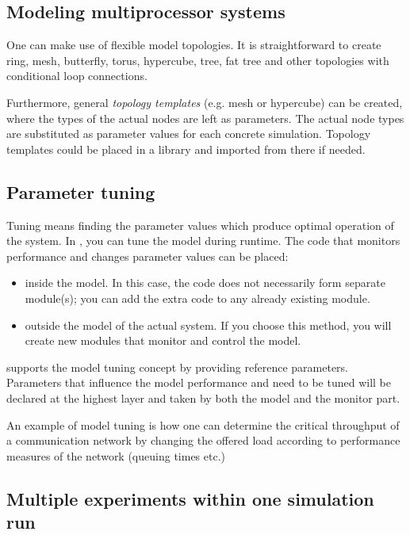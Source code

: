 \subsection{Modeling multiprocessor systems}

One can make use of flexible model topologies. It is straightforward
to create ring, mesh, butterfly, torus, hypercube, tree, fat tree and
other topologies with conditional loop
connections.


Furthermore, general \textit{topology
  templates} (e.g. mesh or hypercube) can be
created, where the types of the actual nodes are left as parameters.
The actual node types are substituted as parameter values for each
concrete simulation. Topology templates could be placed in a library
and imported from there if needed.





\subsection{Parameter tuning}

Tuning means finding the parameter values which produce optimal 
operation of the system. In {\opp}, you can tune the model during 
runtime. The code that monitors performance and changes parameter 
values can be placed:
\begin{itemize}
\item{inside the model. In this case, the code does not necessarily
    form separate module(s); you can add the extra code to any already
    existing module.}
\item{outside the model of the actual system. If you choose this
    method, you will create new modules that monitor and control the
    model.}
\end{itemize}

{\opp} supports the model tuning concept by
providing reference parameters. Parameters that influence the model
performance and need to be tuned will be declared at the highest layer
and taken by both the model and the monitor part.


An example of model tuning is how one can determine the critical 
throughput of a communication network by changing the offered 
load according to performance measures of the network (queuing 
times etc.)





\subsection{Multiple experiments within one simulation run}

